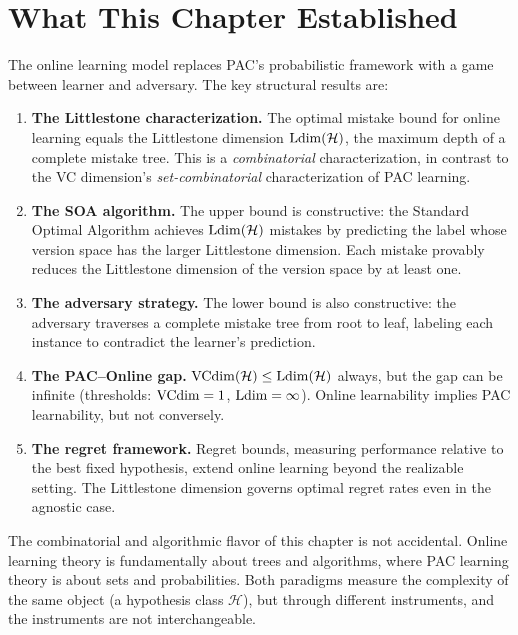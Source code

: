 \section{What This Chapter Established}
\label{sec:ch6-summary}

The online learning model replaces PAC's probabilistic framework with a game between learner and adversary. The key structural results are:

\begin{enumerate}[leftmargin=*, itemsep=3pt]
\item \textbf{The Littlestone characterization.} The optimal mistake bound for online learning equals the Littlestone dimension $\mathrm{Ldim}(\mathcal{H})$, the maximum depth of a complete mistake tree. This is a \emph{combinatorial} characterization, in contrast to the VC dimension's \emph{set-combinatorial} characterization of PAC learning.

\item \textbf{The SOA algorithm.} The upper bound is constructive: the Standard Optimal Algorithm achieves $\mathrm{Ldim}(\mathcal{H})$ mistakes by predicting the label whose version space has the larger Littlestone dimension. Each mistake provably reduces the Littlestone dimension of the version space by at least one.

\item \textbf{The adversary strategy.} The lower bound is also constructive: the adversary traverses a complete mistake tree from root to leaf, labeling each instance to contradict the learner's prediction.

\item \textbf{The PAC--Online gap.} $\mathrm{VCdim}(\mathcal{H}) \leq \mathrm{Ldim}(\mathcal{H})$ always, but the gap can be infinite (thresholds: $\mathrm{VCdim} = 1$, $\mathrm{Ldim} = \infty$). Online learnability implies PAC learnability, but not conversely.

\item \textbf{The regret framework.} Regret bounds, measuring performance relative to the best fixed hypothesis, extend online learning beyond the realizable setting. The Littlestone dimension governs optimal regret rates even in the agnostic case.
\end{enumerate}

The combinatorial and algorithmic flavor of this chapter is not accidental. Online learning theory is fundamentally about trees and algorithms, where PAC learning theory is about sets and probabilities. Both paradigms measure the complexity of the same object (a hypothesis class $\mathcal{H}$), but through different instruments, and the instruments are not interchangeable.

